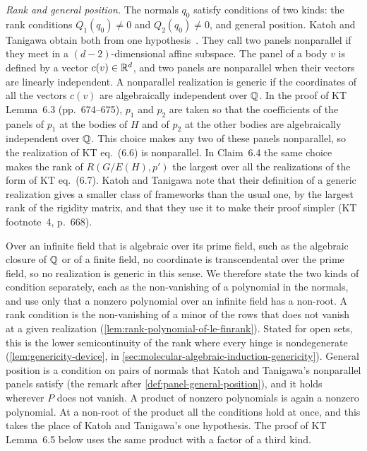 \medskip\noindent\emph{Rank and general position.} The normals $q_0$
satisfy conditions of two kinds: the rank conditions $Q_1(q_0) \neq 0$
and $Q_2(q_0) \neq 0$, and general position. Katoh and Tanigawa obtain
both from one hypothesis~\cite[\S5.1, p.~668]{katohTanigawa2011}. They
call two panels nonparallel if they meet in a $(d-2)$-dimensional affine
subspace. The panel of a body $v$ is defined by a vector
$c(v) \in {\mathbb{R}}^d$, and two panels are nonparallel when their vectors are
linearly independent. A nonparallel realization is generic if the
coordinates of all the vectors $c(v)$ are algebraically independent
over ${\mathbb{Q}}$. In the proof of KT Lemma~6.3 (pp.~674--675), $p_1$ and
$p_2$ are taken so that the coefficients of the panels of $p_1$ at the
bodies of $H$ and of $p_2$ at the other bodies are algebraically
independent over ${\mathbb{Q}}$. This choice makes any two of these panels
nonparallel, so the realization of KT eq.~(6.6) is nonparallel. In
Claim~6.4 the same choice makes the rank of $R(G/E(H), p')$ the largest
over all the realizations of the form of KT eq.~(6.7). Katoh and
Tanigawa note that their definition of a generic realization gives a
smaller class of frameworks than the usual one, by the largest rank of
the rigidity matrix, and that they use it to make their proof simpler
(KT footnote~4, p.~668).

Over an infinite field that is algebraic over its prime field, such as
the algebraic closure of ${\mathbb{Q}}$ or of a finite field, no coordinate is
transcendental over the prime field, so no realization is generic in
this sense. We therefore state the two kinds of condition separately,
each as the non-vanishing of a polynomial in the normals, and use only
that a nonzero polynomial over an infinite field has a non-root. A rank
condition is the non-vanishing of a minor of the rows that does not
vanish at a given realization
(\cref{lem:rank-polynomial-of-le-finrank}). Stated for open sets, this
is the lower semicontinuity of the rank where every hinge is
nondegenerate (\cref{lem:genericity-device}, in
\cref{sec:molecular-algebraic-induction-genericity}). General
position is a condition on pairs of normals that Katoh and Tanigawa's
nonparallel panels satisfy (the remark after
\cref{def:panel-general-position}), and it holds wherever $P$ does not
vanish. A product of nonzero polynomials is again a nonzero polynomial.
At a non-root of the product all the conditions hold at once, and this
takes the place of Katoh and Tanigawa's one hypothesis. The proof of KT
Lemma~6.5 below uses the same product with a factor of a third kind.

